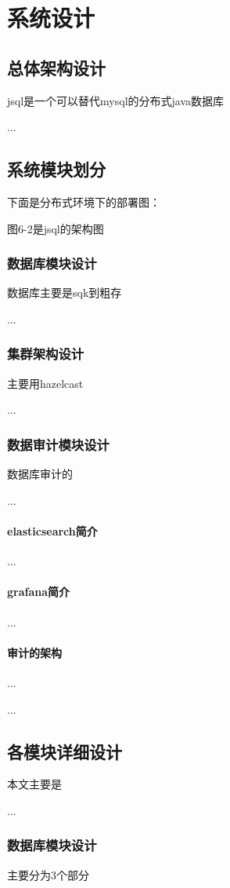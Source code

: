 
\chapter{系统设计}
\section{总体架构设计}
jsql是一个可以替代mysql的分布式java数据库

...
\section{系统模块划分}
下面是分布式环境下的部署图：


图6-2是jsql的架构图


\subsection{数据库模块设计}
数据库主要是sqk到粗存

...
\subsection{集群架构设计}
主要用hazelcast

...
\subsection{数据审计模块设计}
数据库审计的

...
\subsubsection*{elasticsearch简介}
...
\subsubsection*{grafana简介}
...
\subsubsection*{审计的架构}
...

...
\section{各模块详细设计}
本文主要是

...
\subsection{数据库模块设计}
主要分为3个部分

